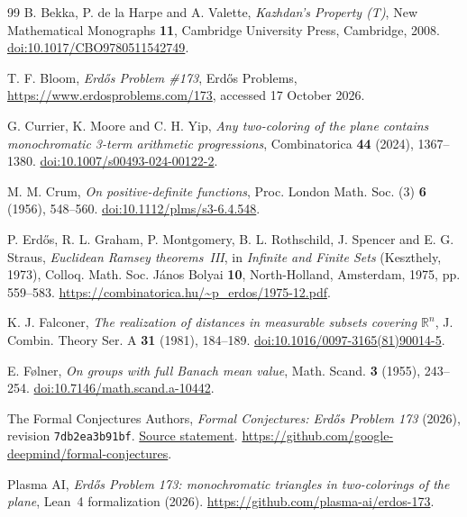 \documentclass[10pt]{article}
\theoremstyle{remark}
\begin{document}
\begin{thebibliography}{99}
B. Bekka, P. de la Harpe and A. Valette, \emph{Kazhdan's Property (T)}, New Mathematical Monographs \textbf{11}, Cambridge University Press, Cambridge, 2008. \href{https://doi.org/10.1017/CBO9780511542749}{doi:10.1017/CBO9780511542749}.

T. F. Bloom, \emph{Erd\H{o}s Problem \#173}, Erd\H{o}s Problems, \url{https://www.erdosproblems.com/173}, accessed 17 October 2026.

G. Currier, K. Moore and C. H. Yip, \emph{Any two-coloring of the plane contains monochromatic 3-term arithmetic progressions}, Combinatorica \textbf{44} (2024), 1367--1380. \href{https://doi.org/10.1007/s00493-024-00122-2}{doi:10.1007/s00493-024-00122-2}.

M. M. Crum, \emph{On positive-definite functions}, Proc. London Math. Soc. (3) \textbf{6} (1956), 548--560. \href{https://doi.org/10.1112/plms/s3-6.4.548}{doi:10.1112/plms/s3-6.4.548}.

P. Erd\H{o}s, R. L. Graham, P. Montgomery, B. L. Rothschild, J. Spencer and E. G. Straus, \emph{Euclidean Ramsey theorems~III}, in \emph{Infinite and Finite Sets} (Keszthely, 1973), Colloq. Math. Soc. J\'{a}nos Bolyai \textbf{10}, North-Holland, Amsterdam, 1975, pp. 559--583. \url{https://combinatorica.hu/~p_erdos/1975-12.pdf}.

K. J. Falconer, \emph{The realization of distances in measurable subsets covering $\mathbb R^n$}, J. Combin. Theory Ser. A \textbf{31} (1981), 184--189. \href{https://doi.org/10.1016/0097-3165(81)90014-5}{doi:10.1016/0097-3165(81)90014-5}.

E. F\o lner, \emph{On groups with full Banach mean value}, Math. Scand. \textbf{3} (1955), 243--254. \href{https://doi.org/10.7146/math.scand.a-10442}{doi:10.7146/math.scand.a-10442}.

The Formal Conjectures Authors, \emph{Formal Conjectures: Erd\H{o}s Problem 173} (2026), revision \texttt{7db2ea3b91bf}. \href{https://github.com/google-deepmind/formal-conjectures/blob/7db2ea3b91bfbd0ab620215163e6c488bbb916d5/FormalConjectures/ErdosProblems/173.lean}{Source statement}. \url{https://github.com/google-deepmind/formal-conjectures}.

Plasma AI, \emph{Erd\H{o}s Problem 173: monochromatic triangles in two-colorings of the plane}, Lean~4 formalization (2026). \url{https://github.com/plasma-ai/erdos-173}.


\end{thebibliography}
\end{document}
